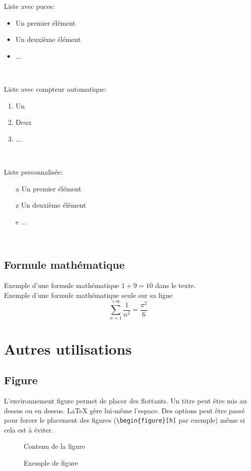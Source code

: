 \documentclass[a4paper]{article}
\begin{document}
			Liste avec puces:
			\begin{itemize}
				\item Un premier élément
				\item Un deuxième élément
				\item ...
			\end{itemize} ~

			Liste avec compteur automatique:
			\begin{enumerate}
				\item Un
				\item Deux
				\item ...
			\end{enumerate} ~

			Liste personnalisée:
			\begin{enumerate}
				\item[a] Un premier élément
				\item[z] Un deuxième élément
				\item[e] ...
			\end{enumerate} ~

		\subsection{Formule mathématique}

			Exemple d'une formule mathématique $1 + 9 = 10$ dans le texte. \\
			
			Exemple d'une formule mathématique seule sur sa ligne \[ \sum_{n=1}^{+\infty} \frac{1}{n^2} = \frac{\pi^2}{6} \]


	\section{Autres utilisations}

		\subsection{Figure}

			L'environnement figure permet de placer des flottants. Un titre peut être mis au dessus ou en dessus. \LaTeX{} gère lui-même l'espace. Des options peut être passé pour forcer le placement des figures (\verb$\begin{figure}[h]$ par exemple) même si cela est à éviter.

			\begin{figure}[h]
			\caption{Exemple de figure}
			\centering Contenu de la figure
			\end{figure}
\end{document}

